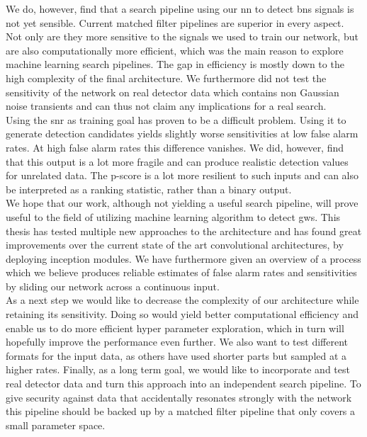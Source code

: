 We do, however, find that a search pipeline using our \gls{nn} to detect \gls{bns} signals is not yet sensible. Current matched filter pipelines are superior in every aspect. Not only are they more sensitive to the signals we used to train our network, but are also computationally more efficient, which was the main reason to explore machine learning search pipelines. The gap in efficiency is mostly down to the high complexity of the final architecture. We furthermore did not test the sensitivity of the network on real detector data which contains non Gaussian noise transients and can thus not claim any implications for a real search.\\
Using the \gls{snr} as training goal has proven to be a difficult problem. Using it to generate detection candidates yields slightly worse sensitivities at low false alarm rates. At high false alarm rates this difference vanishes. We did, however, find that this output is a lot more fragile and can produce realistic detection values for unrelated data. The p-score is a lot more resilient to such inputs and can also be interpreted as a ranking statistic, rather than a binary output.\\
We hope that our work, although not yielding a useful search pipeline, will prove useful to the field of utilizing machine learning algorithm to detect \gls{gw}s. This thesis has tested multiple new approaches to the architecture and has found great improvements over the current state of the art convolutional architectures, by deploying inception modules. We have furthermore given an overview of a process which we believe produces reliable estimates of false alarm rates and sensitivities by sliding our network across a continuous input.\smallskip\\
As a next step we would like to decrease the complexity of our architecture while retaining its sensitivity. Doing so would yield better computational efficiency and enable us to do more efficient hyper parameter exploration, which in turn will hopefully improve the performance even further. We also want to test different formats for the input data, as others have used shorter parts but sampled at a higher rates. Finally, as a long term goal, we would like to incorporate and test real detector data and turn this approach into an independent search pipeline. To give security against data that accidentally resonates strongly with the network this pipeline should be backed up by a matched filter pipeline that only covers a small parameter space.
